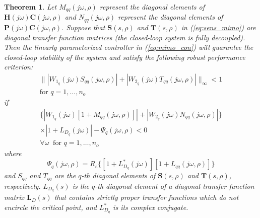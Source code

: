 \documentclass[A4, 10pt, conference]{ieeeconf}
\newcommand{\jo}{(j\omega,\rho)}
\renewcommand{\vec}[1]{\mathbf{#1}}
\begin{document}
\newtheorem{theorem}{Theorem} %
\begin{theorem} 
\label{rob_per}
Let $M_{qq}(j\omega,\rho)$ represent the diagonal elements of $\vec{H}(j\omega)\vec{C}(j\omega,\rho)$ and $N_{qq}(j\omega,\rho)$ represent the diagonal elements of $\vec{P}(j\omega)\vec{C}(j\omega,\rho)$. Suppose that $\vec{S}(s,\rho)$ and $\vec{T}(s,\rho)$ in (\ref{eq:sens_mimo}) are diagonal transfer function matrices (the closed-loop system is fully decoupled). Then the linearly parameterized controller in (\ref{eq:mimo_con}) will guarantee the closed-loop stability of the system and satisfy the following robust performance criterion:
\begin{eqnarray} \label{eq:mimo_hinf}
\| |W_{1_{q}}(j\omega)S_{qq}\jo|+ |W_{2_{q}}(j\omega)T_{qq}\jo| \|_{\infty} < 1 \nonumber\\
\mbox{for }q=1,\ldots,n_o
\end{eqnarray}
if
\begin{eqnarray} \label{eq:mimo_approx}
\{|W_{1_{q}}(j\omega)[1+M_{qq}\jo]|+|W_{2_{q}}(j\omega)N_{qq}\jo|\} \nonumber\\
\times |1+L_{D_{q}}(j\omega)| -\Psi_q\jo<0 \nonumber\\
\forall \omega \: \mbox{ for }q=1,\ldots,n_o  
\end{eqnarray}
where 
$$
\Psi_q\jo=R_e\{[1+L^*_{D_{q}}(j\omega)][1+L_{qq}\jo]\}
$$
and $S_{qq}$ and $T_{qq}$ are the $q$-th diagonal elements of $\vec{S}(s,\rho)$ and $\vec{T}(s,\rho)$, respectively. $L_{D_{q}}(s)$ is the $q$-th diagonal element of a diagonal transfer function matrix $\vec{L}_D(s)$ that contains strictly proper transfer functions which do not encircle the critical point, and $L^*_{D_{q}}$ is its complex conjugate.   
\end{theorem}
\end{document}
